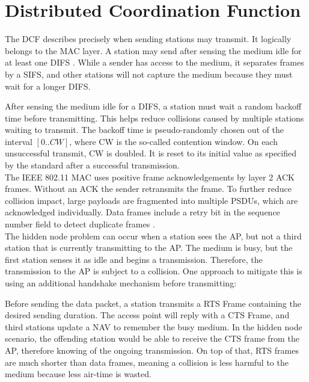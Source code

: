 
\section{Distributed Coordination Function}\label{sec:dcf}

The \gls{DCF} describes precisely when sending stations may transmit. It logically belongs to the \gls{MAC} layer. A station may send after sensing the medium idle for at least one \gls{DIFS} \cite{bianchi2000}. While a sender has access to the medium, it separates frames by a \gls{SIFS}, and other stations will not capture the medium because they must wait for a longer \gls{DIFS}.

After sensing the medium idle for a \gls{DIFS}, a station must wait a random backoff time before transmitting. This helps reduce collisions caused by multiple stations waiting to transmit. The backoff time is pseudo-randomly chosen out of the interval $[0..CW]$, where CW is the so-called contention window. On each unsuccessful transmit, CW is doubled. It is reset to its initial value as specified by the standard after a successful transmission.\\

The \gls{IEEE} 802.11 \gls{MAC} uses positive frame acknowledgements by layer 2 \gls{ACK} frames. Without an \gls{ACK} the sender retransmits the frame. To further reduce collision impact, large payloads are fragmented into multiple PSDUs, which are acknowledged individually. Data frames include a retry bit in the sequence number field to detect duplicate frames \cite{perahia2013}.\\

The hidden node problem can occur when a station sees the \gls{AP}, but not a third station that is currently transmitting to the \gls{AP}. The medium is busy, but the first station senses it as idle and begins a transmission. Therefore, the transmission to the \gls{AP} is subject to a collision. One approach to mitigate this is using an additional handshake mechanism before transmitting:

Before sending the data packet, a station transmits a \gls{RTS} Frame containing the desired sending duration. The access point will reply with a \gls{CTS} Frame, and third stations update a \gls{NAV} to remember the busy medium. In the hidden node scenario, the offending station would be able to receive the \gls{CTS} frame from the \gls{AP}, therefore knowing of the ongoing transmission. On top of that, \gls{RTS} frames are much shorter than data frames, meaning a collision is less harmful to the medium because less air-time is wasted.


